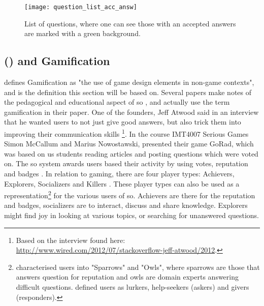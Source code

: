 \begin{figure}[ht]
	\centering
	\texttt{[image: question\_list\_acc\_answ]}
	\caption{List of questions, where one can see those with an accepted answers are marked with a green background.}
	\label{fig:question_list_acc_answ}
\end{figure}

\subsection[Stack Overflow and Gamification]{ () and Gamification}
\label{sec:stackoverflow_gamification}
\citet{Deterding2011} defines Gamification as "the use of game design elements in non-game contexts", and is the definition this section will be based on. 
Several papers make notes of the pedagogical and educational aspect of \gls{so} \cite{Nasehi2012, Posnett2012, Yang2014}, and \cite{Nasehi2012, Yang2014} actually use the term gamification in their paper.
One of the founders, Jeff Atwood said in an interview that he wanted users to not just give good answers, but also trick them into improving their communication skills \cite{Posnett2012}\footnote{
	Based on the interview found here: \\ 
	\url{http://www.wired.com/2012/07/stackoverflow-jeff-atwood/2012}.
	}.
In the course IMT4007 Serious Games Simon McCallum and Marius Nowostawski, presented their game GoRad, which was based on us students reading articles and posting questions which were voted on. 
The \gls{so} system awards users based their activity by using votes, reputation and badges \cite{Sewak2010, Movshovitz-Attias2013, Treude2011, Stackoverflow.com2016, Stackoverflow.com2016c}.
In relation to gaming, there are four player types: Achievers, Explorers, Socializers and Killers \cite[p.~3]{Maan2013}.
\vspace{0.5em}\newline
These player types can also be used as a representation\footnote{	
	\citet{Yang2014} characterised users into "Sparrows" and "Owls", where sparrows are those that answers question for reputation and owls are domain experts answering difficult questions. 
	\citet[p.~2]{Ahmed2015} defined users as lurkers, help-seekers (askers) and givers (responders).	
	} for the various users of \gls{so}. 
Achievers are there for the reputation and badges, socializers are to interact, discuss and share knowledge. 
Explorers might find joy in looking at various topics, or searching for unanswered questions.
